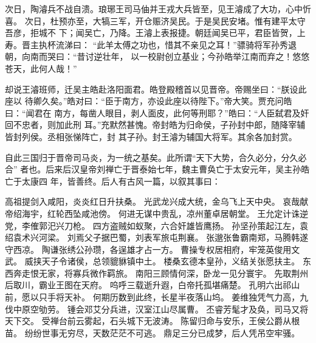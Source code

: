 次日，陶濬兵不战自溃。琅琊王司马伷并王戎大兵皆至，见王濬成了大功，心中忻喜。
次日，杜预亦至，大犒三军，开仓赈济吴民。于是吴民安堵。惟有建平太守吾彦，拒城不
下；闻吴亡，乃降。王濬上表报捷。朝廷闻吴已平，君臣皆贺，上寿。晋主执杯流涕曰：
“此羊太傅之功也，惜其不亲见之耳！”骠骑将军孙秀退朝，向南而哭曰：“昔讨逆壮年，
以一校尉创立基业；今孙皓举江南而弃之！悠悠苍天，此何人哉！”

却说王濬班师，迁吴主皓赴洛阳面君。皓登殿稽首以见晋帝。帝赐坐曰：“朕设此座以
待卿久矣。”皓对曰：“臣于南方，亦设此座以待陛下。”帝大笑。贾充问皓曰：“闻君在
南方，每凿人眼目，剥人面皮，此何等刑耶？”皓曰：“人臣弑君及奸回不忠者，则加此刑
耳。”充默然甚愧。帝封皓为归命侯，子孙封中郎，随降宰辅皆封列侯。丞相张悌阵亡，封
其子孙。封王濬为辅国大将军。其余各加封赏。

自此三国归于晋帝司马炎，为一统之基矣。此所谓“天下大势，合久必分，分久必合”
者也。后来后汉皇帝刘禅亡于晋泰始七年，魏主曹奂亡于太安元年，吴主孙皓亡于太康四
年，皆善终。后人有古风一篇，以叙其事曰：

高祖提剑入咸阳，炎炎红日升扶桑。
光武龙兴成大统，金乌飞上天中央。
哀哉献帝绍海宇，红轮西坠咸池傍。
何进无谋中贵乱，凉州董卓居朝堂。
王允定计诛逆党，李傕郭汜兴刀枪。
四方盗贼如蚁聚，六合奸雄皆鹰扬。
孙坚孙策起江左，袁绍袁术兴河梁。
刘焉父子据巴蜀，刘表军旅屯荆襄。
张邈张鲁霸南郑，马腾韩遂守西凉。
陶谦张绣公孙瓒，各逞雄才占一方。
曹操专权居相府，牢笼英俊用文武。
威挟天子令诸侯，总领貔貅镇中土。
楼桑玄德本皇孙，义结关张愿扶主。
东西奔走恨无家，将寡兵微作羁旅。
南阳三顾情何深，卧龙一见分寰宇。
先取荆州后取川，霸业王图在天府。
呜呼三载逝升遐，白帝托孤堪痛楚。
孔明六出祁山前，愿以只手将天补。
何期历数到此终，长星半夜落山坞。
姜维独凭气力高，九伐中原空劬劳。
锺会邓艾分兵进，汉室江山尽属曹。
丕睿芳髦才及奂，司马又将天下交。
受禅台前云雾起，石头城下无波涛。
陈留归命与安乐，王侯公爵从根苗。
纷纷世事无穷尽，天数茫茫不可逃。
鼎足三分已成梦，后人凭吊空牢骚。